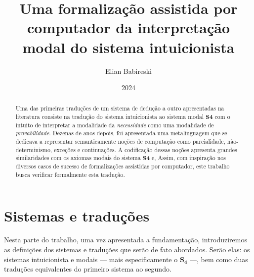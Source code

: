 


    \title{Uma formalização assistida por computador da interpretação modal do sistema intuicionista}
    \author{Elian Babireski}
    \date{2024}

    \maketitle

    \begin{abstract}
        Uma das primeiras traduções de um sistema de dedução a outro apresentadas na literatura consiste na tradução do sistema intuicionista ao sistema modal $\mathbf{S4}$ com o intuito de interpretar a modalidade da \emph{necessidade} como uma modalidade de \emph{provabilidade}. Dezenas de anos depois, foi apresentada uma metalinguagem que se dedicava a representar semanticamente noções de computação como parcialidade, não-determinismo, exceções
        e continuações. A codificação dessas noções apresenta grandes similaridades com os axiomas modais do sistema $\mathbf{S4}$ e,  Assim, com inspiração nos diversos casos de sucesso de formalizações assistidas por computador, este trabalho busca verificar formalmente esta tradução.

        \lipsum[1]
    \end{abstract}

    \begin{otherlanguage}{english} 
        \begin{abstract}
            \lipsum[1]
        \end{abstract}
    \end{otherlanguage}

    \tableofcontents

    
    
    

    \chapter{Sistemas e traduções}

        Nesta parte do trabalho, uma vez apresentada a fundamentação, introduziremos as definições dos sistemas e traduções que serão de fato abordados. Serão elas: os sistemas intuicionista  e modais --- mais especificamente o $\mathbf{S_4}$ ---, bem como duas traduções equivalentes do primeiro sistema ao segundo.

        
        
        

